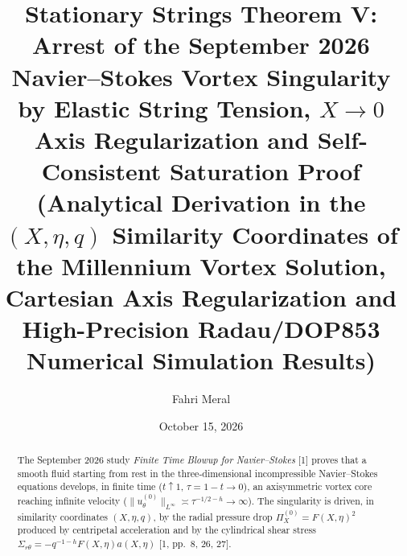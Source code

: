 \documentclass[12pt,a4paper]{article}
\title{\textbf{Stationary Strings Theorem V: Arrest of the September 2026 Navier--Stokes Vortex Singularity by Elastic String Tension, $X \to 0$ Axis Regularization and Self-Consistent Saturation Proof} \\[0.3cm]
\large (Analytical Derivation in the $(X,\eta,q)$ Similarity Coordinates of the Millennium Vortex Solution, Cartesian Axis Regularization and High-Precision Radau/DOP853 Numerical Simulation Results)}
\author{Fahri Meral}
\date{October 15, 2026}
\begin{document}
\maketitle

\begin{abstract}
The September 2026 study \textit{Finite Time Blowup for Navier--Stokes} [1] proves that a smooth fluid starting from rest in the three-dimensional incompressible Navier--Stokes equations develops, in finite time ($t \uparrow 1$, $\tau = 1-t \to 0$), an axisymmetric vortex core reaching infinite velocity ($\|u_\theta^{(0)}\|_{L^\infty} \asymp \tau^{-1/2-h} \to \infty$). The singularity is driven, in similarity coordinates $(X, \eta, q)$, by the radial pressure drop $\Pi_X^{(0)} = F(X,\eta)^2$ produced by centripetal acceleration and by the cylindrical shear stress $\Sigma_{r\theta} = -q^{-1-h} F(X,\eta) a(X,\eta)$ [1, pp.\ 8, 26, 27].


\end{abstract}
\end{document}
